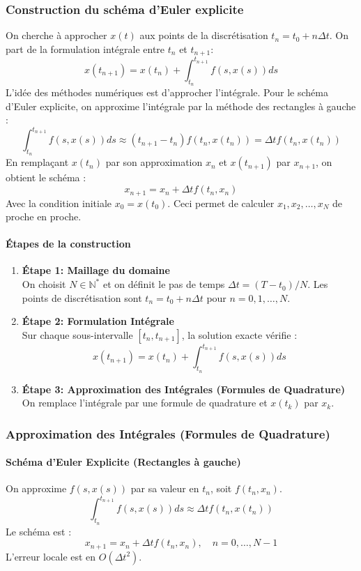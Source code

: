\documentclass{article}
\begin{document}
\subsubsection{Construction du schéma d'Euler explicite} %
On cherche à approcher $x(t)$ aux points de la discrétisation $t_n = t_0 + n \Delta t$.
On part de la formulation intégrale entre $t_n$ et $t_{n+1}$:
\[ x(t_{n+1}) = x(t_n) + \int_{t_n}^{t_{n+1}} f(s, x(s)) ds \]
L'idée des méthodes numériques est d'approcher l'intégrale.
Pour le schéma d'Euler explicite, on approxime l'intégrale par la méthode des rectangles à gauche :
\[ \int_{t_n}^{t_{n+1}} f(s, x(s)) ds \approx (t_{n+1} - t_n) f(t_n, x(t_n)) = \Delta t f(t_n, x(t_n)) \]
En remplaçant $x(t_n)$ par son approximation $x_n$ et $x(t_{n+1})$ par $x_{n+1}$, on obtient le schéma :
\[ x_{n+1} = x_n + \Delta t f(t_n, x_n) \]
Avec la condition initiale $x_0 = x(t_0)$.
Ceci permet de calculer $x_1, x_2, \dots, x_N$ de proche en proche.

\paragraph{Étapes de la construction}
\begin{enumerate}
    \item \textbf{Étape 1: Maillage du domaine} \\
    On choisit $N \in \mathbb{N}^*$ et on définit le pas de temps $\Delta t = (T - t_0) / N$.
    Les points de discrétisation sont $t_n = t_0 + n \Delta t$ pour $n=0, 1, \dots, N$.
    \item \textbf{Étape 2: Formulation Intégrale} \\
    Sur chaque sous-intervalle $[t_n, t_{n+1}]$, la solution exacte vérifie :
    \[ x(t_{n+1}) = x(t_n) + \int_{t_n}^{t_{n+1}} f(s, x(s)) ds \]
    \item \textbf{Étape 3: Approximation des Intégrales (Formules de Quadrature)} \\
    On remplace l'intégrale par une formule de quadrature et $x(t_k)$ par $x_k$.
\end{enumerate}

\subsubsection{Approximation des Intégrales (Formules de Quadrature)} %

\paragraph{Schéma d'Euler Explicite (Rectangles à gauche)}
On approxime $f(s, x(s))$ par sa valeur en $t_n$, soit $f(t_n, x_n)$.
\[ \int_{t_n}^{t_{n+1}} f(s, x(s)) ds \approx \Delta t f(t_n, x(t_n)) \]
Le schéma est :
\[ x_{n+1} = x_n + \Delta t f(t_n, x_n), \quad n=0, \dots, N-1 \]
L'erreur locale est en $O(\Delta t^2)$.
\end{document}
